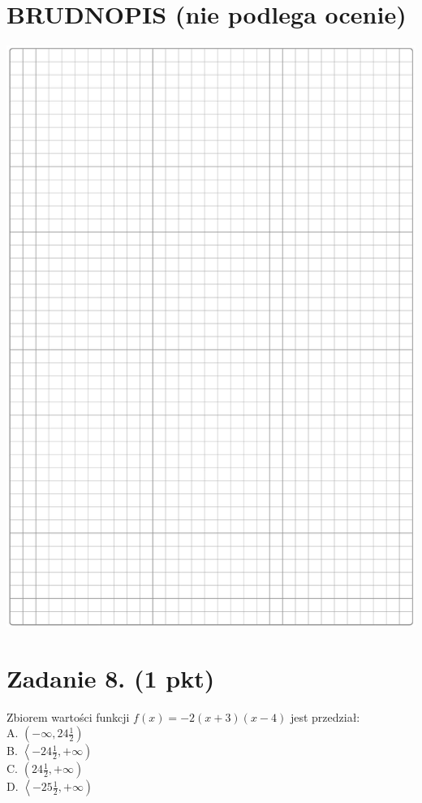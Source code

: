 \documentclass[10pt]{article}
\begin{document}
\section*{BRUDNOPIS (nie podlega ocenie)}
\begin{center}
\includegraphics[max width=\textwidth]{2024_11_21_769d5953f978b92e06f5g-03}
\end{center}

\section*{Zadanie 8. (1 pkt)}
Zbiorem wartości funkcji \(f(x)=-2(x+3)(x-4)\) jest przedział:\\
A. \(\left(-\infty, 24 \frac{1}{2}\right)\)\\
B. \(\left\langle-24 \frac{1}{2},+\infty\right)\)\\
C. \(\left(24 \frac{1}{2},+\infty\right)\)\\
D. \(\left\langle-25 \frac{1}{2},+\infty\right)\)
\end{document}
